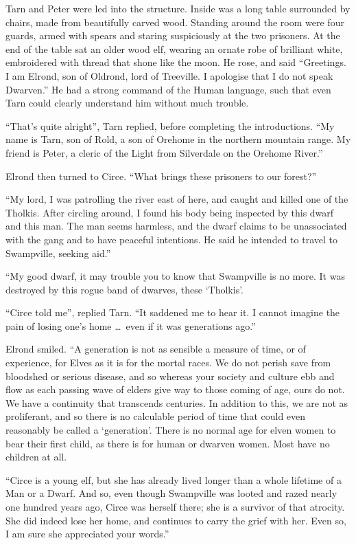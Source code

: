 Tarn and Peter were led into the structure.  Inside was a long table surrounded by chairs, made from beautifully carved wood.  Standing around the room were four guards, armed with spears and staring suspiciously at the two prisoners.  At the end of the table sat an older wood elf, wearing an ornate robe of brilliant white, embroidered with thread that shone like the moon.  He rose, and said ``Greetings.  I am Elrond, son of Oldrond, lord of Treeville.  I apologise that I do not speak Dwarven.''  He had a strong command of the Human language, such that even Tarn could clearly understand him without much trouble.

``That's quite alright'', Tarn replied, before completing the introductions.  ``My name is Tarn, son of Rold, a son of Orehome in the northern mountain range.  My friend is Peter, a cleric of the Light from Silverdale on the Orehome River.''

Elrond then turned to Circe. ``What brings these prisoners to our forest?''

``My lord, I was patrolling the river east of here, and caught and killed one of the Tholkis.  After circling around, I found his body being inspected by this dwarf and this man.  The man seems harmless, and the dwarf claims to be unassociated with the gang and to have peaceful intentions.  He said he intended to travel to Swampville, seeking aid.''

``My good dwarf, it may trouble you to know that Swampville is no more.  It was destroyed by this rogue band of dwarves, these `Tholkis'.

``Circe told me'', replied Tarn.  ``It saddened me to hear it.  I cannot imagine the pain of losing one's home \ldots\ even if it was generations ago.''

Elrond smiled.  ``A generation is not as sensible a measure of time, or of experience, for Elves as it is for the mortal races.  We do not perish save from bloodshed or serious disease, and so whereas your society and culture ebb and flow as each passing wave of elders give way to those coming of age, ours do not.  We have a continuity that transcends centuries.  In addition to this, we are not as proliferant, and so there is no calculable period of time that could even reasonably be called a `generation'.  There is no normal age for elven women to bear their first child, as there is for human or dwarven women.  Most have no children at all.

``Circe is a young elf, but she has already lived longer than a whole lifetime of a Man or a Dwarf.  And so, even though Swampville was looted and razed nearly one hundred years ago, Circe was herself there; she is a survivor of that atrocity.  She did indeed lose her home, and continues to carry the grief with her.  Even so, I am sure she appreciated your words.''

